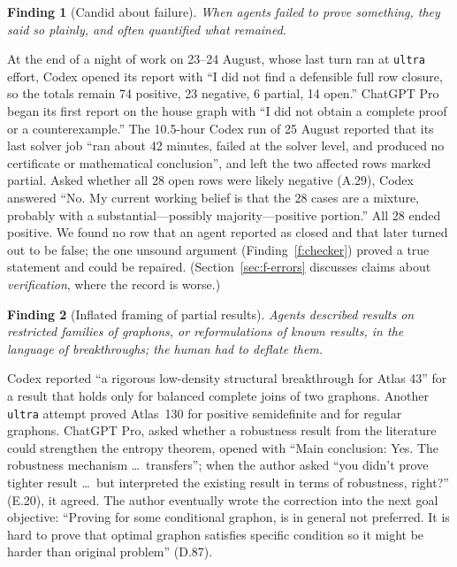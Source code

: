\documentclass[11pt,a4paper]{article}
\newtheorem{finding}{Finding}
\newcommand{\ttt}[1]{\texttt{#1}}
\begin{document}
\begin{finding}[Candid about failure]\label{f:candid}
When agents failed to prove something, they said so plainly, and often quantified what remained.
\end{finding}
At the end of a night of work on 23--24 August, whose last turn ran at \ttt{ultra} effort, Codex opened its
report with ``I did not find a defensible full row closure, so the totals remain 74 positive, 23 negative, 6 partial, 14 open.''
ChatGPT Pro began its first report on the house graph with ``I did not obtain a complete proof or a
counterexample.'' The 10.5-hour Codex run of 25 August reported that its last solver job ``ran about 42
minutes, failed at the solver level, and produced no certificate or mathematical conclusion'', and left the
two affected rows marked partial. Asked whether all 28 open rows were likely negative (A.29), Codex answered
``No. My current working belief is that the 28 cases are a mixture, probably with a substantial---possibly
majority---positive portion.'' All 28 ended positive. We found no row that an agent reported as closed and that later
turned out to be false; the one unsound argument (Finding~\ref{f:checker}) proved a true statement and could
be repaired. (Section~\ref{sec:f-errors} discusses claims about
\emph{verification}, where the record is worse.)

\begin{finding}[Inflated framing of partial results]\label{f:framing}
Agents described results on restricted families of graphons, or reformulations of known results, in the
language of breakthroughs; the human had to deflate them.
\end{finding}
Codex reported ``a rigorous low-density structural breakthrough for Atlas 43'' for a result that holds only for
balanced complete joins of two graphons. Another \ttt{ultra} attempt proved Atlas~130 for positive semidefinite
and for regular graphons. ChatGPT Pro, asked whether a robustness result from the literature could strengthen
the entropy theorem, opened with ``Main conclusion: Yes. The robustness mechanism \dots\ transfers''; when the
author asked ``you didn't prove tighter result \dots\ but interpreted the existing result in terms of
robustness, right?'' (E.20), it agreed. The author eventually wrote the correction into the next goal
objective: ``Proving for some conditional graphon, is in general not preferred. It is hard to prove that optimal
graphon satisfies specific condition so it might be harder than original problem'' (D.87).
\end{document}
